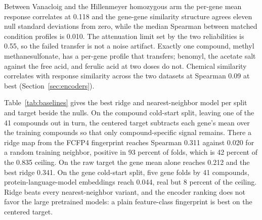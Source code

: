 
Between Vanacloig and the Hillenmeyer homozygous arm the per-gene mean response correlates at
0.118 and the gene-gene similarity structure agrees eleven null standard deviations from zero,
while the median Spearman between matched condition profiles is 0.010. The attenuation limit
set by the two reliabilities is 0.55, so the failed transfer is not a noise artifact. Exactly
one compound, methyl methanesulfonate, has a per-gene profile that transfers; benomyl, the
acetate salt against the free acid, and ferulic acid at two doses do not. Chemical similarity
correlates with response similarity across the two datasets at Spearman 0.09 at best
(Section~\ref{sec:encoders}).

Table~\ref{tab:baselines} gives the best ridge and nearest-neighbor model per split and
target beside the nulls. On the compound cold-start split, leaving one of the 41 compounds out
in turn, the centered target subtracts each gene's mean over the training compounds so that
only compound-specific signal remains. There a ridge map from the FCFP4 fingerprint reaches
Spearman 0.311 against 0.020 for a random training neighbor, positive in 93 percent of folds,
which is 42 percent of the 0.835 ceiling. On the raw target the gene mean alone reaches
0.212 and the best ridge 0.341. On the gene cold-start split, five gene folds by 41 compounds,
protein-language-model embeddings reach 0.044, real but 8 percent of the ceiling. Ridge beats
every nearest-neighbor variant, and the encoder ranking does not favor the large pretrained
models: a plain feature-class fingerprint is best on the centered target.

